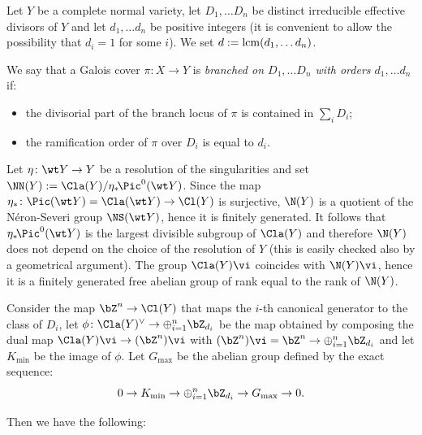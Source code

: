 \documentclass[10pt]{amsart}
\numberwithin{equation}{section}
\begin{document}
Let $Y$ be a complete normal   variety,  let $D_1, \dots D_n$ be distinct  irreducible effective divisors of $Y$ and let $d_1,\dots d_n$ be positive integers (it is convenient to allow the possibility that $d_i=1$ for  some $i$). We set $d:={\rm lcm}(d_1,\dots d_n)$.

We say that a Galois cover $\pi\colon X\to Y$ is {\em branched on $D_1, \dots D_n$ with orders $d_1,\dots d_n$} if:

\begin{itemize}
\item the divisorial part of the branch  locus of $\pi$ is contained in $\sum_i D_i$; 
\item the ramification order of $\pi$ over $D_i$ is equal to $d_i$.
\end{itemize}


Let $\eta\colon \wt Y\to Y$ be a resolution of the singularities and
set  
${\NN}(Y):=\Cla(Y)/\eta_*\!\Pic^0(\wt Y)$. Since  the map $\eta_*\colon \Pic(\wt Y)=\Cla(\wt Y)\to \Cl(Y)$ is surjective, $\N(Y)$ is a quotient of  the N\'eron-Severi group $\NS(\wt Y)$, hence it is finitely generated.  It follows that $\eta_*\!\Pic^0(\wt Y)$ is the largest divisible subgroup of $\Cla(Y)$ and therefore $\N(Y)$ does not depend on the choice of the resolution of $Y$ (this is easily checked also by a geometrical argument).  
The group $\Cla(Y)\vi$ coincides with $\N(Y)\vi$, hence it is a finitely generated free abelian group of rank equal to the rank of $\N(Y)$.

Consider the map  $\bZ^n\to \Cl(Y)$ that maps the $i$-th canonical generator to the class of $D_i$,
  let $\phi\colon \Cla(Y)^{\vee}\to \oplus_{i=1}^n\bZ_{d_i}$  be the map obtained by composing the dual map  $\Cla(Y)\vi\to (\bZ^n)\vi$ with $(\bZ^n)\vi =\bZ^n\to \oplus_{i=1}^n\bZ_{d_i}$ and let $K_{\min}$  be the image of $\phi$. 
  Let $G_{\max}$ be the abelian group defined by the exact sequence:
\begin{equation}\label{eq:Gmax}
0\to K_{\min} \to \oplus_{i=1}^n \bZ_{d_i}\to G_{\max}\to 0.
\end{equation} 

Then we have the following:
\end{document}
